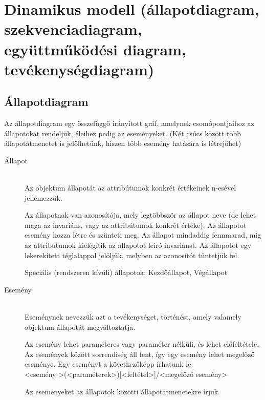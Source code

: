 \documentclass[margin=0px]{article}
\begin{document}
	\section{Dinamikus modell (állapotdiagram, szekvenciadiagram,\\ együttműködési diagram, tevékenységdiagram)}
		
		\subsection{Állapotdiagram}
			Az állapotdiagram egy összefüggő irányított gráf, amelynek csomópontjaihoz az állapotokat rendeljük, éleihez pedig az eseményeket. (Két csúcs között több állapotátmenetet is jelölhetünk, hiszen több esemény hatására is létrejöhet)
			\begin{description}
				\item[Állapot] \hfill \\
					Az objektum állapotát az attribútumok konkrét értékeinek n-esével jellemezzük.
					
					Az állapotnak van azonosítója, mely legtöbbször az állapot neve (de lehet maga az invariáns, vagy az attribútumok konkrét értéke). Az állapotot esemény hozza létre és szünteti meg. Az állapot mindaddig fennmarad, míg az attribútumok kielégítik az állapotot leíró invariánst. Az állapotot egy lekerekített téglalappal jelöljük, melyben az azonosítót tüntetjük fel.
					
					Speciális (rendszeren kívüli) állapotok: Kezdőállapot, Végállapot
				\item[Esemény] \hfill \\
					Eseménynek nevezzük azt a tevékenységet, történést, amely valamely objektum állapotát megváltoztatja.
					
					Az esemény lehet paraméteres vagy paraméter nélküli, és lehet előfeltétele. Az események között sorrendiség áll fent, így egy esemény lehet megelőző eseménye. Egy eseményt a következőképp írhatunk le:\\
					\textless esemény \textgreater (\textless paraméterek\textgreater)[\textless feltétel\textgreater]/\textless megelőző esemény\textgreater
					
					Az eseményeket az állapotok közötti állapotátmenetekre írjuk.
\iffalse			 
		  		\begin{figure}[H]
						\centering
						\texttt{[image: img/plane.png]}
						\caption{Repülőgép állapotgépe}
					\end{figure}
\fi
			\end{description}
\end{document}
